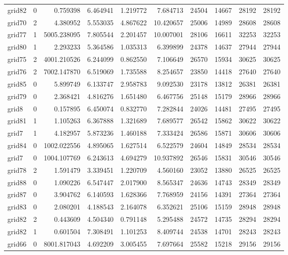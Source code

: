 \begin{longtable}{|l|r|r|r|r|r|r|r|r|r|}
grid82 & 0 & 0.759398 & 6.464941 & 1.219772 & 7.684713 & 24504 & 14667 & 28192 & 28192 \\
grid70 & 2 & 4.380952 & 5.553035 & 4.867622 & 10.420657 & 25006 & 14989 & 28608 & 28608 \\
grid77 & 1 & 5005.238095 & 7.805544 & 2.201457 & 10.007001 & 28106 & 16611 & 32253 & 32253 \\
grid80 & 1 & 2.293233 & 5.364586 & 1.035313 & 6.399899 & 24378 & 14637 & 27944 & 27944 \\
grid75 & 2 & 4001.210526 & 6.244099 & 0.862550 & 7.106649 & 26570 & 15934 & 30625 & 30625 \\
grid76 & 2 & 7002.147870 & 6.519069 & 1.735588 & 8.254657 & 23850 & 14418 & 27640 & 27640 \\
grid85 & 0 & 5.899749 & 6.133747 & 2.958783 & 9.092530 & 23178 & 13812 & 26381 & 26381 \\
grid79 & 0 & 2.368421 & 4.816276 & 1.651480 & 6.467756 & 25148 & 15179 & 28966 & 28966 \\
grid8 & 0 & 0.157895 & 6.450074 & 0.832770 & 7.282844 & 24026 & 14481 & 27495 & 27495 \\
grid81 & 1 & 1.105263 & 6.367888 & 1.321689 & 7.689577 & 26542 & 15862 & 30622 & 30622 \\
grid7 & 1 & 4.182957 & 5.873236 & 1.460188 & 7.333424 & 26586 & 15871 & 30606 & 30606 \\
grid84 & 0 & 1002.022556 & 4.895065 & 1.627514 & 6.522579 & 24604 & 14849 & 28534 & 28534 \\
grid7 & 0 & 1004.107769 & 6.243613 & 4.694279 & 10.937892 & 26546 & 15831 & 30546 & 30546 \\
grid78 & 2 & 1.591479 & 3.339451 & 1.220709 & 4.560160 & 23052 & 13880 & 26525 & 26525 \\
grid88 & 0 & 1.090226 & 6.547447 & 2.017900 & 8.565347 & 24636 & 14743 & 28349 & 28349 \\
grid87 & 0 & 3.904762 & 6.140593 & 1.628366 & 7.768959 & 24156 & 14391 & 27364 & 27364 \\
grid83 & 0 & 2.080201 & 4.188543 & 2.164078 & 6.352621 & 25106 & 15159 & 28948 & 28948 \\
grid82 & 2 & 0.443609 & 4.504340 & 0.791148 & 5.295488 & 24572 & 14735 & 28294 & 28294 \\
grid82 & 1 & 0.601504 & 7.308491 & 1.101253 & 8.409744 & 24538 & 14701 & 28243 & 28243 \\
grid66 & 0 & 8001.817043 & 4.692209 & 3.005455 & 7.697664 & 25582 & 15218 & 29156 & 29156 \\

\end{longtable}
